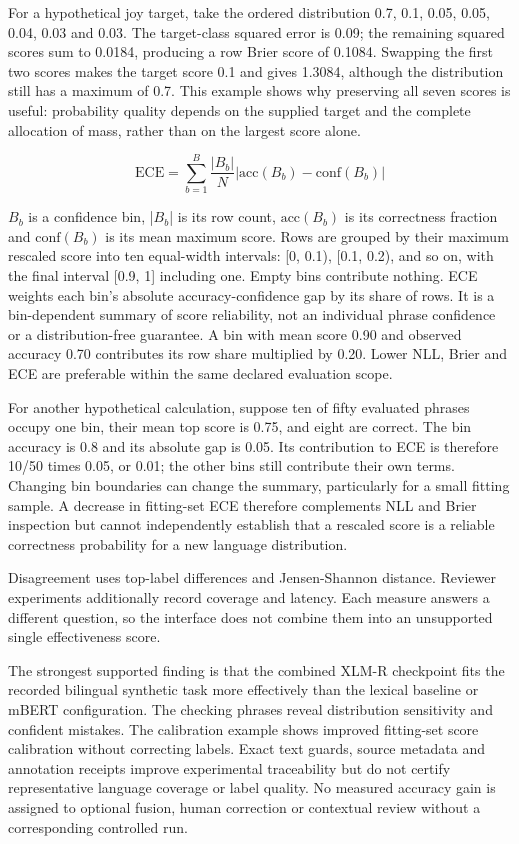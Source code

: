 \documentclass[journal]{IEEEtran}
\begin{document}
For a hypothetical joy target, take the ordered distribution 0.7, 0.1, 0.05, 0.05, 0.04, 0.03 and 0.03. The target-class squared error is 0.09; the remaining squared scores sum to 0.0184, producing a row Brier score of 0.1084. Swapping the first two scores makes the target score 0.1 and gives 1.3084, although the distribution still has a maximum of 0.7. This example shows why preserving all seven scores is useful: probability quality depends on the supplied target and the complete allocation of mass, rather than on the largest score alone.

\begin{equation}
\mathrm{ECE}=\sum_{b=1}^{B}\frac{|B_b|}{N}\left|\mathrm{acc}(B_b)-\mathrm{conf}(B_b)\right|
\label{eq:ece}
\end{equation}

\(B_b\) is a confidence bin, |\(B_b\)| is its row count, \(\mathrm{acc}(B_b)\) is its correctness fraction and \(\mathrm{conf}(B_b)\) is its mean maximum score. Rows are grouped by their maximum rescaled score into ten equal-width intervals: [0, 0.1), [0.1, 0.2), and so on, with the final interval [0.9, 1] including one. Empty bins contribute nothing. ECE weights each bin's absolute accuracy-confidence gap by its share of rows. It is a bin-dependent summary of score reliability, not an individual phrase confidence or a distribution-free guarantee. A bin with mean score 0.90 and observed accuracy 0.70 contributes its row share multiplied by 0.20. Lower NLL, Brier and ECE are preferable within the same declared evaluation scope.

For another hypothetical calculation, suppose ten of fifty evaluated phrases occupy one bin, their mean top score is 0.75, and eight are correct. The bin accuracy is 0.8 and its absolute gap is 0.05. Its contribution to ECE is therefore 10/50 times 0.05, or 0.01; the other bins still contribute their own terms. Changing bin boundaries can change the summary, particularly for a small fitting sample. A decrease in fitting-set ECE therefore complements NLL and Brier inspection but cannot independently establish that a rescaled score is a reliable correctness probability for a new language distribution.

Disagreement uses top-label differences and Jensen-Shannon distance. Reviewer experiments additionally record coverage and latency. Each measure answers a different question, so the interface does not combine them into an unsupported single effectiveness score.

The strongest supported finding is that the combined XLM-R checkpoint fits the recorded bilingual synthetic task more effectively than the lexical baseline or mBERT configuration. The checking phrases reveal distribution sensitivity and confident mistakes. The calibration example shows improved fitting-set score calibration without correcting labels. Exact text guards, source metadata and annotation receipts improve experimental traceability but do not certify representative language coverage or label quality. No measured accuracy gain is assigned to optional fusion, human correction or contextual review without a corresponding controlled run.
\end{document}

